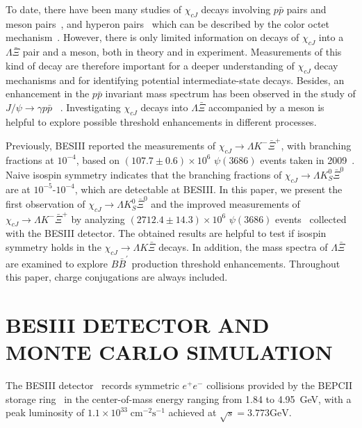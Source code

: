 \documentclass[amsmath,amssymb,twocolumn,prd,floatfix,showpacs,nofootinbib]{revtex4-1}
\begin{document}
To date, there have been many studies of $\chi_{cJ}$ decays involving $p\bar p$ pairs and meson pairs~\cite{ref::pppipi,ref::pppi0pi0,ref::ppkk}, and hyperon pairs~\cite{ref::lambdalambdabar,ref::sigmasigmabar} which can be described by the color octet mechanism~\cite{ref::oct1,ref::oct2}.
However, there is only limited information on decays of $ \chi_{cJ}$ into a $ \Lambda \bar{\Xi}$ pair and a meson, both in theory and in experiment. Measurements of this kind of decay are therefore important for a deeper understanding of $\chi_{cJ}$ decay mechanisms and for identifying potential intermediate-state decays. Besides, an enhancement in the $ p \bar p$ invariant mass spectrum has been observed in the study of $J/\psi \to \gamma p\bar p$ ~\cite{ref::ppbar1,ref::ppbar2}. Investigating $ \chi_{cJ}$ decays into $ \Lambda \bar{\Xi}$ accompanied by a meson is helpful to explore possible threshold enhancements in different processes.

Previously, BESIII reported the measurements of $\chi_{cJ}\to \Lambda K^-\bar \Xi^+$, with branching fractions at $10^{-4}$, based on $(107.7\pm0.6)\times10^6$ $\psi(3686)$ events taken in 2009~\cite{ref::LXiK}. Naive isospin symmetry indicates that the branching fractions of $\chi_{cJ}\to \Lambda K^0_S\bar \Xi^0$ are at $10^{-5}$-$10^{-4}$, which are detectable at BESIII. In this paper, we present the first observation of  $\chi_{cJ} \to \Lambda K^0_S\bar \Xi^0$ and the improved measurements of $\chi_{cJ} \to \Lambda K^-\bar \Xi^+$ by analyzing $(2712.4\pm14.3)\times10^6$ $\psi(3686)$ events~\cite{ref::psip-num-inc} collected with the BESIII detector. The obtained results are helpful to test if isospin symmetry holds in the $\chi_{cJ}\to \Lambda K \bar \Xi$ decays. In addition, the mass spectra of $\Lambda \bar \Xi$ are examined to explore $B\bar B^\prime$ production threshold enhancements. 
Throughout this paper, charge conjugations are always included.

\section{BESIII DETECTOR AND MONTE CARLO SIMULATION}
\label{sec:BES}

The BESIII detector~\cite{ref::detector} records symmetric $e^+e^-$ collisions provided by the BEPCII storage ring~\cite{ref::collider}
in the center-of-mass energy ranging from 1.84 to 4.95~GeV,
with a peak luminosity of $1.1 \times 10^{33}\;\text{cm}^{-2}\text{s}^{-1}$
achieved at $\sqrt{s} = 3.773\text{GeV}$.
\end{document}
